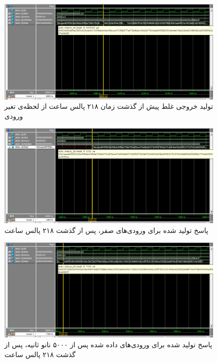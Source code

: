 \begin{figure}[H]
	\centering
	\includegraphics[width=16cm]{../RunData/sim_glitch1.png}	
	\caption{
		تولید خروجی غلط پیش از گذشت زمان ۲۱۸ پالس ساعت از لحظه‌ی تغیر ورودی
	}
\end{figure}
\begin{figure}[H]
	\centering
	\includegraphics[width=16cm]{../RunData/sim_part1.png}	
	\caption{
		پاسخ تولید شده برای ورودی‌های صفر، پس از گذشت ۲۱۸ پالس ساعت
	}
\end{figure}
\begin{figure}[H]
	\centering
	\includegraphics[width=16cm]{../RunData/sim_part2.png}	
	\caption{
		پاسخ تولید شده برای ورودی‌های داده شده پس از ۵۰۰۰ نانو ثانیه، پس از گذشت ۲۱۸ پالس ساعت
	}
\end{figure}
